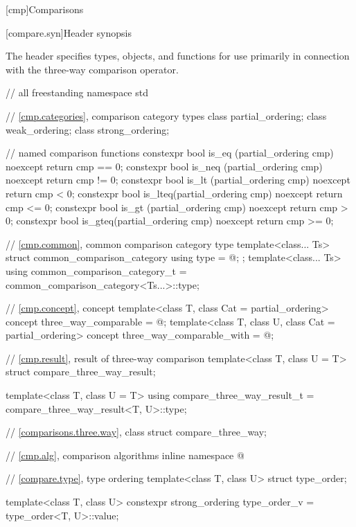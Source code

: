 [cmp]{Comparisons}

[compare.syn]{Header  synopsis}

\pnum
The header  specifies types, objects, and functions
for use primarily in connection with
the three-way comparison operator.

%
%
%
%
%
%
%
%
%
\begin{codeblock}
// all freestanding
namespace std {
  // \ref{cmp.categories}, comparison category types
  class partial_ordering;
  class weak_ordering;
  class strong_ordering;

  // named comparison functions
  constexpr bool is_eq  (partial_ordering cmp) noexcept { return cmp == 0; }
  constexpr bool is_neq (partial_ordering cmp) noexcept { return cmp != 0; }
  constexpr bool is_lt  (partial_ordering cmp) noexcept { return cmp < 0; }
  constexpr bool is_lteq(partial_ordering cmp) noexcept { return cmp <= 0; }
  constexpr bool is_gt  (partial_ordering cmp) noexcept { return cmp > 0; }
  constexpr bool is_gteq(partial_ordering cmp) noexcept { return cmp >= 0; }

  // \ref{cmp.common}, common comparison category type
  template<class... Ts>
  struct common_comparison_category {
    using type = @\seebelow@;
  };
  template<class... Ts>
    using common_comparison_category_t = common_comparison_category<Ts...>::type;

  // \ref{cmp.concept}, concept 
  template<class T, class Cat = partial_ordering>
    concept three_way_comparable = @\seebelow@;
  template<class T, class U, class Cat = partial_ordering>
    concept three_way_comparable_with = @\seebelow@;

  // \ref{cmp.result}, result of three-way comparison
  template<class T, class U = T> struct compare_three_way_result;

  template<class T, class U = T>
    using compare_three_way_result_t = compare_three_way_result<T, U>::type;

  // \ref{comparisons.three.way}, class 
  struct compare_three_way;

  // \ref{cmp.alg}, comparison algorithms
  inline namespace @

  // \ref{compare.type}, type ordering
  template<class T, class U>
    struct type_order;

  template<class T, class U>
    constexpr strong_ordering type_order_v = type_order<T, U>::value;
}
\end{codeblock}

